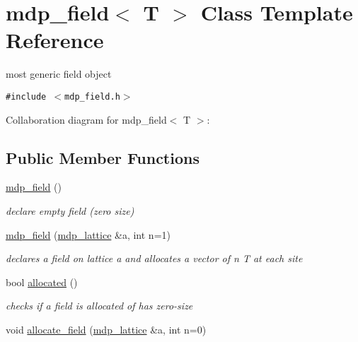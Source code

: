 \hypertarget{classmdp__field}{
\section{mdp\_\-field$<$ T $>$ Class Template Reference}
\label{classmdp__field}
}
most generic field object  


{\tt \#include $<$mdp\_\-field.h$>$}

Collaboration diagram for mdp\_\-field$<$ T $>$:\subsection*{Public Member Functions}
\begin{CompactItemize}
\item 
\hypertarget{classmdp__field_b3e16ee58db96391a255579bc89d8535}{
\hyperlink{classmdp__field_b3e16ee58db96391a255579bc89d8535}{mdp\_\-field} ()}
\label{classmdp__field_b3e16ee58db96391a255579bc89d8535}

\begin{CompactList}\small\item\em declare empty field (zero size) \item\end{CompactList}\item 
\hypertarget{classmdp__field_aae273c82d9b0931e31f7265d5ca2652}{
\hyperlink{classmdp__field_aae273c82d9b0931e31f7265d5ca2652}{mdp\_\-field} (\hyperlink{classmdp__lattice}{mdp\_\-lattice} \&a, int n=1)}
\label{classmdp__field_aae273c82d9b0931e31f7265d5ca2652}

\begin{CompactList}\small\item\em declares a field on lattice a and allocates a vector of n T at each site \item\end{CompactList}\item 
\hypertarget{classmdp__field_d306195eb4961253cef69e5fb33bce69}{
bool \hyperlink{classmdp__field_d306195eb4961253cef69e5fb33bce69}{allocated} ()}
\label{classmdp__field_d306195eb4961253cef69e5fb33bce69}

\begin{CompactList}\small\item\em checks if a field is allocated of has zero-size \item\end{CompactList}\item 
\hypertarget{classmdp__field_b76ac5e0273aa3e1b5070fc3d7a0dc84}{
void \hyperlink{classmdp__field_b76ac5e0273aa3e1b5070fc3d7a0dc84}{allocate\_\-field} (\hyperlink{classmdp__lattice}{mdp\_\-lattice} \&a, int n=0)}
\label{classmdp__field_b76ac5e0273aa3e1b5070fc3d7a0dc84}


\end{CompactItemize}
